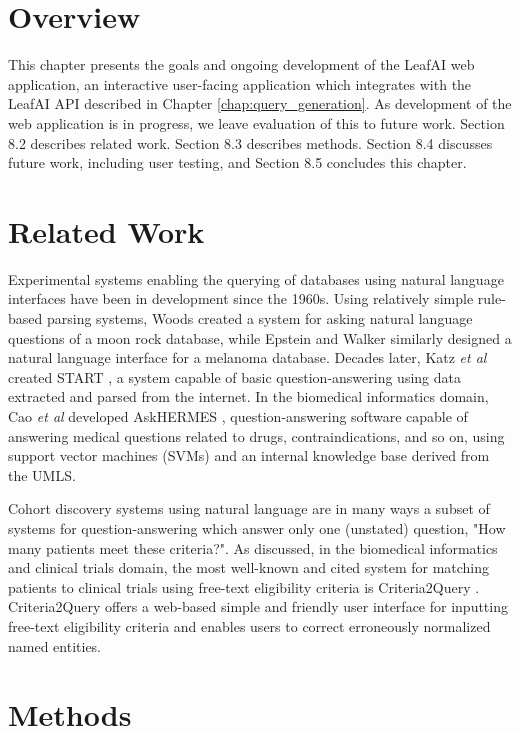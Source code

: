 \documentclass[../main.tex]{subfiles}
\begin{document}
\section{Overview}

This chapter presents the goals and ongoing development of the LeafAI web application, an interactive user-facing application which integrates with the LeafAI API described in Chapter \ref{chap:query_generation}. As development of the web application is in progress, we leave evaluation of this to future work. Section 8.2 describes related work. Section 8.3 describes methods. Section 8.4 discusses future work, including user testing, and Section 8.5 concludes this chapter. 

\section{Related Work}

Experimental systems enabling the querying of databases using natural language interfaces have been in development since the 1960s. Using relatively simple rule-based parsing systems, Woods \cite{woods1973progress} created a system for asking natural language questions of a moon rock database, while Epstein and Walker \cite{epstein1978natural} similarly designed a natural language interface for a melanoma database. Decades later, Katz \textit{et al} created START \cite{katz1999integrating}, a system capable of basic question-answering using data extracted and parsed from the internet. In the biomedical informatics domain, Cao \textit{et al} developed AskHERMES \cite{cao2011askhermes}, question-answering software capable of answering medical questions related to drugs, contraindications, and so on, using support vector machines (SVMs) and an internal knowledge base derived from the UMLS.

Cohort discovery systems using natural language are in many ways a subset of systems for question-answering which answer only one (unstated) question, "How many patients meet these criteria?". As discussed, in the biomedical informatics and clinical trials domain, the most well-known and cited system for matching patients to clinical trials using free-text eligibility criteria is Criteria2Query \cite{yuan2019criteria2query, fang2022combining}. Criteria2Query offers a web-based simple and friendly user interface for inputting free-text eligibility criteria and enables users to correct erroneously normalized named entities.

\section{Methods}
\end{document}
